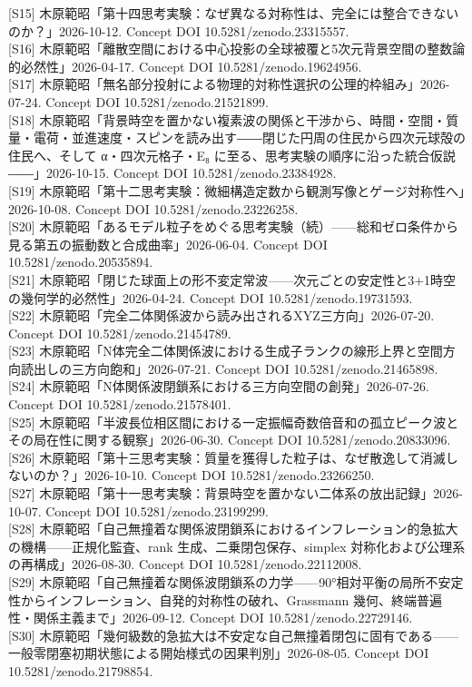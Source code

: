 \documentclass[
  a4paper,
]{ltjsarticle}
\begin{document}
{[}S15{]}
木原範昭「第十四思考実験：なぜ異なる対称性は、完全には整合できないのか？」2026-10-12.
Concept DOI 10.5281/zenodo.23315557.\\
{[}S16{]}
木原範昭「離散空間における中心投影の全球被覆と5次元背景空間の整数論的必然性」2026-04-17.
Concept DOI 10.5281/zenodo.19624956.\\
{[}S17{]}
木原範昭「無名部分投射による物理的対称性選択の公理的枠組み」2026-07-24.
Concept DOI 10.5281/zenodo.21521899.\\
{[}S18{]}
木原範昭「背景時空を置かない複素波の関係と干渉から、時間・空間・質量・電荷・並進速度・スピンを読み出す――閉じた円周の住民から四次元球殻の住民へ、そして
α・四次元格子・E₈ に至る、思考実験の順序に沿った統合仮説――」2026-10-15.
Concept DOI 10.5281/zenodo.23384928.\\
{[}S19{]}
木原範昭「第十二思考実験：微細構造定数から観測写像とゲージ対称性へ」2026-10-08.
Concept DOI 10.5281/zenodo.23226258.\\
{[}S20{]}
木原範昭「あるモデル粒子をめぐる思考実験（続）------総和ゼロ条件から見る第五の振動数と合成曲率」2026-06-04.
Concept DOI 10.5281/zenodo.20535894.\\
{[}S21{]}
木原範昭「閉じた球面上の形不変定常波------次元ごとの安定性と3+1時空の幾何学的必然性」2026-04-24.
Concept DOI 10.5281/zenodo.19731593.\\
{[}S22{]} 木原範昭「完全二体関係波から読み出されるXYZ三方向」2026-07-20.
Concept DOI 10.5281/zenodo.21454789.\\
{[}S23{]}
木原範昭「N体完全二体関係波における生成子ランクの線形上界と空間方向読出しの三方向飽和」2026-07-21.
Concept DOI 10.5281/zenodo.21465898.\\
{[}S24{]} 木原範昭「N体関係波閉鎖系における三方向空間の創発」2026-07-26.
Concept DOI 10.5281/zenodo.21578401.\\
{[}S25{]}
木原範昭「半波長位相区間における一定振幅奇数倍音和の孤立ピーク波とその局在性に関する観察」2026-06-30.
Concept DOI 10.5281/zenodo.20833096.\\
{[}S26{]}
木原範昭「第十三思考実験：質量を獲得した粒子は、なぜ散逸して消滅しないのか？」2026-10-10.
Concept DOI 10.5281/zenodo.23266250.\\
{[}S27{]}
木原範昭「第十一思考実験：背景時空を置かない二体系の放出記録」2026-10-07.
Concept DOI 10.5281/zenodo.23199299.\\
{[}S28{]}
木原範昭「自己無撞着な関係波閉鎖系におけるインフレーション的急拡大の機構------正規化監査、rank
生成、二乗閉包保存、simplex 対称化および公理系の再構成」2026-08-30.
Concept DOI 10.5281/zenodo.22112008.\\
{[}S29{]}
木原範昭「自己無撞着な関係波閉鎖系の力学------90°相対平衡の局所不安定性からインフレーション、自発的対称性の破れ、Grassmann
幾何、終端普遍性・関係主義まで」2026-09-12. Concept DOI
10.5281/zenodo.22729146.\\
{[}S30{]}
木原範昭「幾何級数的急拡大は不安定な自己無撞着閉包に固有である------一般零閉塞初期状態による開始様式の因果判別」2026-08-05.
Concept DOI 10.5281/zenodo.21798854.
\end{document}
